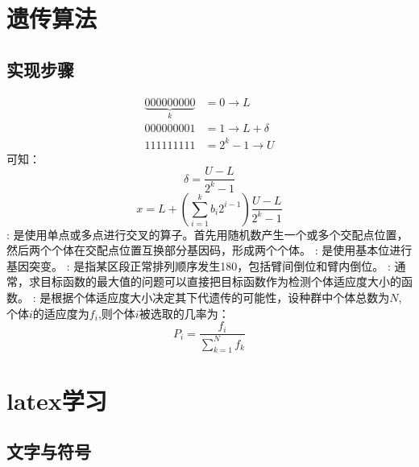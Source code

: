 \documentclass[12pt,a4paper]{article}
\begin{document}
\section{遗传算法}
\subsection{实现步骤}
\begin{enumerate}
\begin{displaymath}
\begin{split}
\underbrace{000000000}_{k}&=0\longrightarrow L\\
000000001&=1\longrightarrow L+\delta\\
111111111&=2^k-1\longrightarrow U
\end{split}
\end{displaymath}
可知：
\begin{displaymath}
\delta=\frac{U-L}{2^k-1}
\end{displaymath}
$$x=L+(\sum_{i=1}^{k}b_i2^{i-1})\frac{U-L}{2^k-1}$$
:
是使用单点或多点进行交叉的算子。首先用随机数产生一个或多个交配点位置，然后两个个体在交配点位置互换部分基因码，形成两个个体。
:
是使用基本位进行基因突变。
:
是指某区段正常排列顺序发生180，包括臂间倒位和臂内倒位。
:
通常，求目标函数的最大值的问题可以直接把目标函数作为检测个体适应度大小的函数。
:
是根据个体适应度大小决定其下代遗传的可能性，设种群中个体总数为$N$,个体$i$的适应度为$f_i$,则个体$i$被选取的几率为：
$$P_i=\frac {f_i}{\sum_{k=1}^{N}f_k}$$
\end{enumerate}

\section{latex学习}
\subsection{文字与符号}
\end{document}
